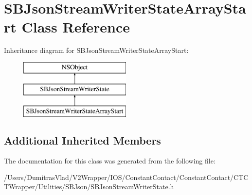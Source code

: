 \hypertarget{interface_s_b_json_stream_writer_state_array_start}{\section{S\-B\-Json\-Stream\-Writer\-State\-Array\-Start Class Reference}
\label{interface_s_b_json_stream_writer_state_array_start}
}
Inheritance diagram for S\-B\-Json\-Stream\-Writer\-State\-Array\-Start\-:\begin{figure}[H]
\begin{center}
\leavevmode
\includegraphics[height=3.000000cm]{interface_s_b_json_stream_writer_state_array_start}
\end{center}
\end{figure}
\subsection*{Additional Inherited Members}


The documentation for this class was generated from the following file\-:\begin{DoxyCompactItemize}
\item 
/\-Users/\-Dumitras\-Vlad/\-V2\-Wrapper/\-I\-O\-S/\-Constant\-Contact/\-Constant\-Contact/\-C\-T\-C\-T\-Wrapper/\-Utilities/\-S\-B\-Json/S\-B\-Json\-Stream\-Writer\-State.\-h\end{DoxyCompactItemize}
